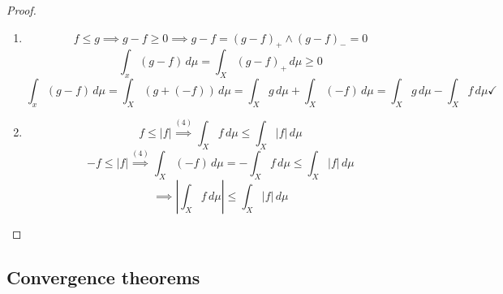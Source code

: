 \documentclass{article}
\newcommand{\card}[1]{\left|#1\right|}
\begin{document}
\begin{proof}
\begin{enumerate}
    \item
      \[ f \leq g \implies g-f \geq 0 \implies g-f = (g-f)_+ \land (g-f)_- = 0 \]
      \[ \int_x (g-f) \, d\mu = \int_X (g-f)_+ \, d\mu \geq 0 \]
      \[ \int_x (g-f) \, d\mu = \int_X (g + (-f)) \, d\mu = \int_X g \, d\mu + \int_X (-f)\, d\mu = \int_X g \, d\mu - \int_X f \, d\mu \checkmark \]

    \item
      \[ f \leq \card{f} \stackrel{(4)}{\implies} \int_X f \, d\mu \leq \int_X \card{f} \, d\mu \]
      \[ -f \leq \card{f} \stackrel{(4)}{\implies} \int_X (-f) \, d\mu = -\int_X f \, d\mu \leq \int_X \card{f} \, d\mu \]
      \[ \implies \card{\int_X f \, d\mu} \leq \int_X \card{f} \, d\mu \]
  \end{enumerate}
\end{proof}

\subsection{Convergence theorems}
\end{document}

